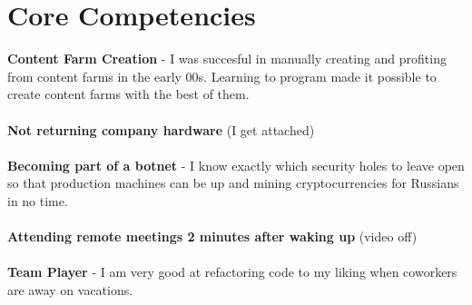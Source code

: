 \documentclass[10pt]{article} %
\begin{document}
\begin{minipage}[t]{0.44\textwidth}


\section{Core Competencies} 
    \normalsize{\textbf{Content Farm Creation} - I was succesful in manually creating and profiting from content farms in the early 00s. Learning to program made it possible to create content farms with the best of them.}\\
\\
    \normalsize{\textbf{Not returning company hardware} (I get attached) }\\
\\
\normalsize{\textbf{Becoming part of a botnet} - I know exactly which security holes to leave open so that production machines can be up and mining cryptocurrencies for Russians in no time. }\\
\\
    \normalsize{\textbf{Attending remote meetings 2 minutes after waking up} (video off) }\\
\\
    \normalsize{\textbf{Team Player} - I am very good at refactoring code to my liking when coworkers are away on vacations.}\\
\\







	
\end{minipage} %
\end{document}
